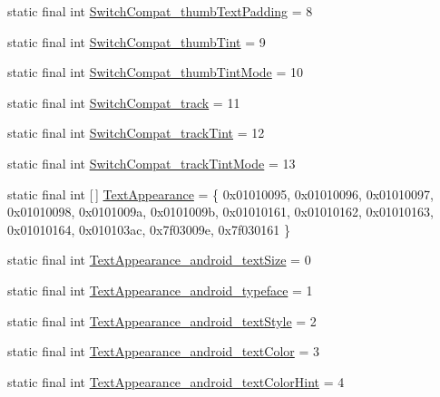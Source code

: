 \begin{DoxyCompactItemize}
\item 
static final int \mbox{\hyperlink{classcom_1_1google_1_1android_1_1gms_1_1R_1_1styleable_a18cd24686ccca4ea513c45df09f21b5b}{Switch\+Compat\+\_\+thumb\+Text\+Padding}} = 8
\item 
static final int \mbox{\hyperlink{classcom_1_1google_1_1android_1_1gms_1_1R_1_1styleable_a928506b4ff1bf377a926722dbd42988d}{Switch\+Compat\+\_\+thumb\+Tint}} = 9
\item 
static final int \mbox{\hyperlink{classcom_1_1google_1_1android_1_1gms_1_1R_1_1styleable_a017d9a4b43d574cb3b8668caab955ab5}{Switch\+Compat\+\_\+thumb\+Tint\+Mode}} = 10
\item 
static final int \mbox{\hyperlink{classcom_1_1google_1_1android_1_1gms_1_1R_1_1styleable_a937b92b3cf453d12edb97613b5514b3b}{Switch\+Compat\+\_\+track}} = 11
\item 
static final int \mbox{\hyperlink{classcom_1_1google_1_1android_1_1gms_1_1R_1_1styleable_a25bec9f63b9e1d40da26221bc5acd6f3}{Switch\+Compat\+\_\+track\+Tint}} = 12
\item 
static final int \mbox{\hyperlink{classcom_1_1google_1_1android_1_1gms_1_1R_1_1styleable_ae86da28aeb4cda182035bd368e22d430}{Switch\+Compat\+\_\+track\+Tint\+Mode}} = 13
\item 
static final int \mbox{[}$\,$\mbox{]} \mbox{\hyperlink{classcom_1_1google_1_1android_1_1gms_1_1R_1_1styleable_a377f953e7ff829a5ada3fe850ae2c9f3}{Text\+Appearance}} = \{ 0x01010095, 0x01010096, 0x01010097, 0x01010098, 0x0101009a, 0x0101009b, 0x01010161, 0x01010162, 0x01010163, 0x01010164, 0x010103ac, 0x7f03009e, 0x7f030161 \}
\item 
static final int \mbox{\hyperlink{classcom_1_1google_1_1android_1_1gms_1_1R_1_1styleable_aee080b1daba4c067520ae51309d2101c}{Text\+Appearance\+\_\+android\+\_\+text\+Size}} = 0
\item 
static final int \mbox{\hyperlink{classcom_1_1google_1_1android_1_1gms_1_1R_1_1styleable_a77f5207253ed9b35138d1ac857c9f7d8}{Text\+Appearance\+\_\+android\+\_\+typeface}} = 1
\item 
static final int \mbox{\hyperlink{classcom_1_1google_1_1android_1_1gms_1_1R_1_1styleable_ac449f5b9fa9628e3d3da795cf7664b3e}{Text\+Appearance\+\_\+android\+\_\+text\+Style}} = 2
\item 
static final int \mbox{\hyperlink{classcom_1_1google_1_1android_1_1gms_1_1R_1_1styleable_ae7bc84bbacab1a5b3ebfc9a021cdc61a}{Text\+Appearance\+\_\+android\+\_\+text\+Color}} = 3
\item 
static final int \mbox{\hyperlink{classcom_1_1google_1_1android_1_1gms_1_1R_1_1styleable_afae417b53f3b349ef7c9ab418ca9a398}{Text\+Appearance\+\_\+android\+\_\+text\+Color\+Hint}} = 4

\end{DoxyCompactItemize}
